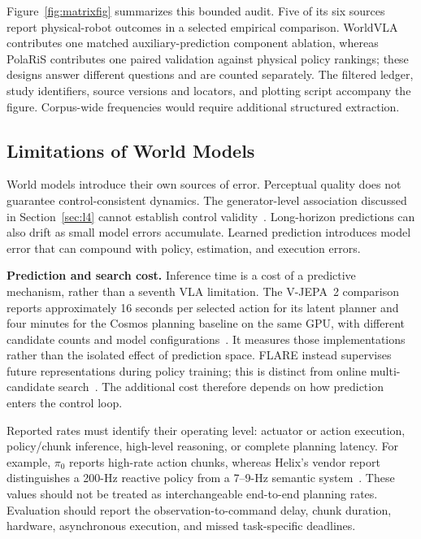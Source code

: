 \documentclass{ieeeaccess}
\begin{document}
\textcolor[RGB]{104,48,148}{Figure~\ref{fig:matrixfig} summarizes this bounded audit. Five of its six sources report physical-robot outcomes in a selected empirical comparison. WorldVLA contributes one matched auxiliary-prediction component ablation, whereas PolaRiS contributes one paired validation against physical policy rankings; these designs answer different questions and are counted separately. The filtered ledger, study identifiers, source versions and locators, and plotting script accompany the figure. Corpus-wide frequencies would require additional structured extraction.}

\subsection{Limitations of World Models}
\label{sec:wmweak}

World models introduce their own sources of error. Perceptual quality does not guarantee control-consistent dynamics. \textcolor[RGB]{104,48,148}{The generator-level association discussed in Section~\ref{sec:l4} cannot establish control validity~\cite{physicsiq}.} Long-horizon predictions can also drift as small model errors accumulate. \textcolor[RGB]{104,48,148}{Learned prediction introduces model error that can compound with policy, estimation, and execution errors.}

\textcolor[RGB]{104,48,148}{\noindent\textbf{Prediction and search cost.}\label{sec:deliberation-cost}
Inference time is a cost of a predictive mechanism, rather than a seventh VLA limitation. The V-JEPA~2 comparison reports approximately 16 seconds per selected action for its latent planner and four minutes for the Cosmos planning baseline on the same GPU, with different candidate counts and model configurations~\cite{vjepa2}. It measures those implementations rather than the isolated effect of prediction space. FLARE instead supervises future representations during policy training; this is distinct from online multi-candidate search~\cite{flarewm}. The additional cost therefore depends on how prediction enters the control loop.}

\textcolor[RGB]{104,48,148}{Reported rates must identify their operating level: actuator or action execution, policy/chunk inference, high-level reasoning, or complete planning latency. For example, $\pi_0$ reports high-rate action chunks, whereas Helix's vendor report distinguishes a 200-Hz reactive policy from a 7--9-Hz semantic system~\cite{pi0,helix}. These values should not be treated as interchangeable end-to-end planning rates. Evaluation should report the observation-to-command delay, chunk duration, hardware, asynchronous execution, and missed task-specific deadlines.}
\end{document}
